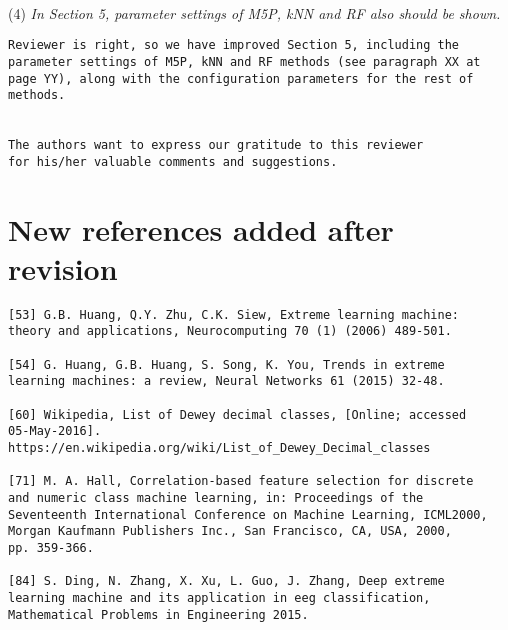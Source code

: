 \documentclass[preprint]{elsarticle}
\begin{document}
~\\
\noindent (4) \emph{In Section 5, parameter settings of 
M5P, kNN and RF also should be shown. } 

\begin{verbatim}
Reviewer is right, so we have improved Section 5, including the 
parameter settings of M5P, kNN and RF methods (see paragraph XX at 
page YY), along with the configuration parameters for the rest of 
methods.


The authors want to express our gratitude to this reviewer 
for his/her valuable comments and suggestions.
\end{verbatim}



\section{New references added after revision}

\begin{verbatim}
[53] G.B. Huang, Q.Y. Zhu, C.K. Siew, Extreme learning machine: 
theory and applications, Neurocomputing 70 (1) (2006) 489-501.

[54] G. Huang, G.B. Huang, S. Song, K. You, Trends in extreme 
learning machines: a review, Neural Networks 61 (2015) 32-48.

[60] Wikipedia, List of Dewey decimal classes, [Online; accessed 
05-May-2016]. https://en.wikipedia.org/wiki/List_of_Dewey_Decimal_classes

[71] M. A. Hall, Correlation-based feature selection for discrete 
and numeric class machine learning, in: Proceedings of the 
Seventeenth International Conference on Machine Learning, ICML2000, 
Morgan Kaufmann Publishers Inc., San Francisco, CA, USA, 2000, 
pp. 359-366.

[84] S. Ding, N. Zhang, X. Xu, L. Guo, J. Zhang, Deep extreme 
learning machine and its application in eeg classification, 
Mathematical Problems in Engineering 2015.

\end{verbatim}
\end{document}
